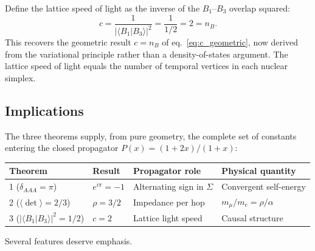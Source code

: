 \begin{corollary}\label{cor:speed_of_light}
Define the lattice speed of light as the inverse of the
$B_1$--$B_3$ overlap squared:
\begin{equation}
c = \frac{1}{|\langle B_1 | B_3 \rangle|^2} = \frac{1}{1/2} = 2 = n_B.
\end{equation}
This recovers the geometric result $c = n_B$ of
eq.~\eqref{eq:c_geometric}, now derived from the variational
principle rather than a density-of-states argument.  The lattice speed
of light equals the number of temporal vertices in each nuclear
simplex.
\end{corollary}

\subsection{Implications}
\label{sec:variational_implications}

The three theorems supply, from pure geometry, the complete set of
constants entering the closed propagator $P(x) = (1+2x)/(1+x)$:

\begin{center}
\renewcommand{\arraystretch}{1.3}
\begin{tabular}{llll}
\toprule
Theorem & Result & Propagator role & Physical quantity \\
\midrule
1 ($\delta_{AAA} = \pi$) & $e^{i\pi} = -1$ & Alternating sign in $\Sigma$ & Convergent self-energy \\
2 ($\langle\det\rangle = 2/3$) & $\rho = 3/2$ & Impedance per hop & $m_\mu/m_e = \rho/\alpha$ \\
3 ($|\langle B_1|B_3\rangle|^2 = 1/2$) & $c = 2$ & Lattice light speed & Causal structure \\
\bottomrule
\end{tabular}
\end{center}

\noindent
Several features deserve emphasis.


